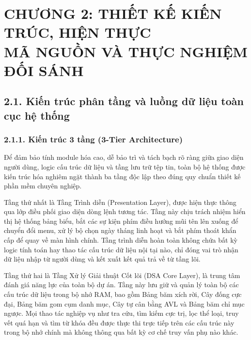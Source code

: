 \documentclass[14pt,a4paper]{extarticle}
\begin{document}
\newpage
\section*{CHƯƠNG 2: THIẾT KẾ KIẾN TRÚC, HIỆN THỰC\\MÃ NGUỒN VÀ THỰC NGHIỆM ĐỐI SÁNH}

\subsection*{2.1. Kiến trúc phân tầng và luồng dữ liệu toàn cục hệ thống}

\subsubsection*{2.1.1. Kiến trúc 3 tầng (3-Tier Architecture)}

Để đảm bảo tính module hóa cao, dễ bảo trì và tách bạch rõ ràng giữa giao diện người dùng, logic cấu trúc dữ liệu và tầng lưu trữ tệp tin, toàn bộ hệ thống được kiến trúc hóa nghiêm ngặt thành ba tầng độc lập theo đúng quy chuẩn thiết kế phần mềm chuyên nghiệp.

Tầng thứ nhất là Tầng Trình diễn (Presentation Layer), được hiện thực thông qua lớp điều phối giao diện dòng lệnh tương tác. Tầng này chịu trách nhiệm hiển thị hệ thống bảng biểu, bắt các sự kiện phím điều hướng mũi tên lên xuống để chuyển đổi menu, xử lý bộ chọn ngày tháng linh hoạt và bắt phím thoát khẩn cấp để quay về màn hình chính. Tầng trình diễn hoàn toàn không chứa bất kỳ logic tính toán hay thao tác cấu trúc dữ liệu nội tại nào, chỉ đóng vai trò nhận dữ liệu nhập từ người dùng và kết xuất kết quả trả về từ tầng lõi.

Tầng thứ hai là Tầng Xử lý Giải thuật Cốt lõi (DSA Core Layer), là trung tâm đánh giá năng lực của toàn bộ dự án. Tầng này lưu giữ và quản lý toàn bộ các cấu trúc dữ liệu trong bộ nhớ RAM, bao gồm Bảng băm xích rời, Cây đống cực đại, Bảng băm gom cụm danh mục, Cây tự cân bằng AVL và Bảng băm chỉ mục ngược. Mọi thao tác nghiệp vụ như tra cứu, tìm kiếm cực trị, lọc thể loại, truy vết quá hạn và tìm từ khóa đều được thực thi trực tiếp trên các cấu trúc này trong bộ nhớ chính mà không thông qua bất kỳ cơ chế truy vấn phụ nào khác.
\end{document}
